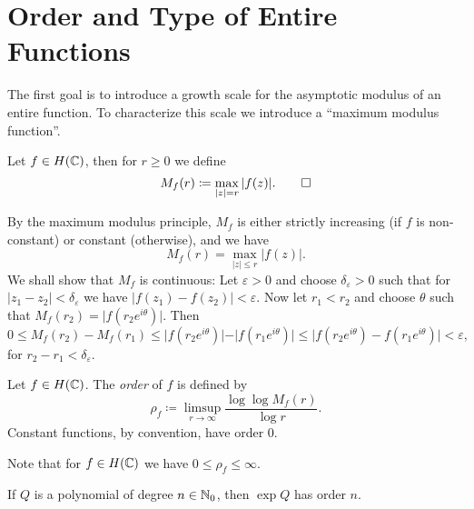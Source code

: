 \section{Order and Type of Entire Functions} \label{sec:order-type}

The first goal is to introduce a growth scale for the asymptotic modulus of an entire function. To characterize this scale we introduce a ``maximum modulus function''.

\begin{definition}
    Let $f \in H(\mathbb{C})$, then for $r \geq 0$ we define
    \begin{equation*}
        M_f(r) \coloneqq \max_{\vert z \vert = r} \vert f(z) \vert. \qedhere
    \end{equation*}
\end{definition}

\begin{remark}    
    By the maximum modulus principle, $M_f$ is either strictly increasing (if $f$ is non-constant) or constant (otherwise), and we have
    $$ M_f(r) = \max_{\vert z \vert \leq r} \vert f(z) \vert. $$
    We shall show that $M_f$ is continuous: Let $\varepsilon > 0$ and choose $\delta_\varepsilon > 0$ such that for ${\vert z_1 - z_2 \vert < \delta_\varepsilon}$ we have ${\vert f(z_1) - f(z_2) \vert < \varepsilon}$. Now let $r_1 < r_2$ and choose $\theta$ such that $M_f(r_2) = \vert f(r_2 e^{i \theta}) \vert$. Then
    \begin{equation*}
        0 \leq M_f(r_2) - M_f(r_1) \leq \vert f(r_2 e^{i \theta}) \vert - \vert f(r_1 e^{i \theta}) \vert \leq \vert f(r_2 e^{i \theta}) - f(r_1 e^{i \theta}) \vert < \varepsilon,
    \end{equation*}
    for $r_2 - r_1 < \delta_\varepsilon$.
\end{remark}

\begin{definition} \label{def:order}
    Let $f \in H(\mathbb{C})$. The \emph{order} of $f$ is defined by
    \begin{equation} \label{eq:def-order}
        \rho_f \coloneqq \limsup_{r \to \infty} \frac{\log \log M_f(r)}{\log r}.
    \end{equation}
    Constant functions, by convention, have order 0.
\end{definition}

Note that for $f \in H(\mathbb{C})$ we have $0 \leq \rho_f \leq \infty$.

\begin{proposition} \label{prop:order-exponential-polynomial}
    If $Q$ is a polynomial of degree $n \in \mathbb{N}_0$, then $\exp Q$ has order $n$.
\end{proposition}

